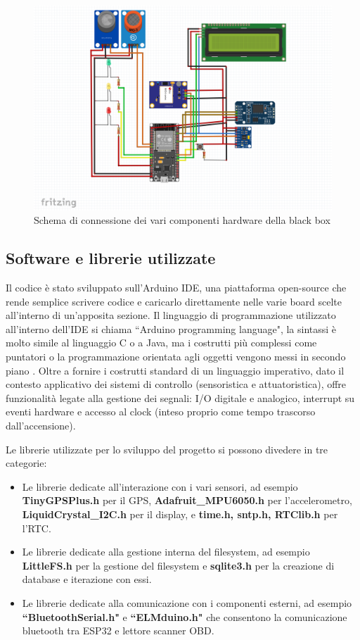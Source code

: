 \documentclass[12pt, a4paper, italian]{report}
\numberwithin{figure}{chapter}
\numberwithin{table}{chapter}
\begin{document}
\begin{figure}[h]
  \centering
  \includegraphics[width=12cm]{circuito_logo.png}
  \caption{Schema di connessione dei vari componenti hardware della black box}
  \label{fig:schemaCircuito}
\end{figure}

\subsection{Software e librerie utilizzate}
Il codice è stato sviluppato sull'Arduino IDE, una piattaforma open-source che rende semplice scrivere codice e caricarlo direttamente nelle varie board scelte all'interno di un'apposita sezione. Il linguaggio di programmazione utilizzato all'interno dell'IDE si chiama ``Arduino programming language", la sintassi è molto simile al linguaggio C o a Java, ma i costrutti più complessi come puntatori o la programmazione orientata agli oggetti vengono messi in secondo piano \cite{sistemiEmbeddedAtrent}. Oltre a fornire i costrutti standard di un linguaggio imperativo, dato il contesto applicativo dei sistemi di controllo (sensoristica e attuatoristica), offre funzionalità legate alla gestione dei segnali: I/O digitale e analogico, interrupt su eventi hardware e accesso al clock (inteso proprio come tempo trascorso dall'accensione).

Le librerie utilizzate per lo sviluppo del progetto si possono divedere in tre categorie:

\begin{itemize}
    \item Le librerie dedicate all'interazione con i vari sensori, ad esempio \textbf{TinyGPSPlus.h} per il GPS, \textbf{Adafruit\_MPU6050.h} per l'accelerometro, \textbf{LiquidCrystal\_I2C.h} per il display, e \textbf{time.h, sntp.h, RTClib.h} per l'RTC.
    \item Le librerie dedicate alla gestione interna del filesystem, ad esempio \textbf{LittleFS.h} per la gestione del filesystem e \textbf{sqlite3.h} per la creazione di database e iterazione con essi.
    \item Le librerie dedicate alla comunicazione con i componenti esterni, ad esempio \textbf{``BluetoothSerial.h"} e \textbf{``ELMduino.h"} che consentono la comunicazione bluetooth tra ESP32 e lettore scanner OBD.
\end{itemize}
\end{document}
